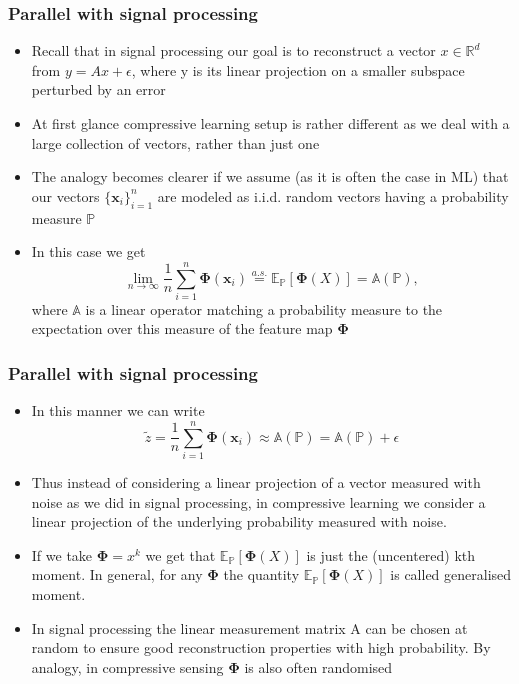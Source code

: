 
\begin{frame}
	\frametitle{Parallel with signal processing}
	
	\begin{itemize}
	 	\item Recall that in signal processing our goal is to reconstruct a vector $x \in \mathbb{R}^{d}$ from $y = Ax + \epsilon$, where y is its linear projection on a smaller subspace perturbed by an error
	 	\item At first glance compressive learning setup is rather different as we deal with a large collection of vectors, rather than just one
	 	\item The analogy becomes clearer if we assume (as it is often the case in ML) that our vectors {$\{\boldsymbol{x}_{i}\}_{i = 1}^{n}$} are modeled as i.i.d. random vectors having a probability measure $\mathbb{P}$
	 	
	 	\item In this case we get
		$$
				\lim _{n \rightarrow \infty} \frac{1}{n} \sum_{i=1}^{n} \boldsymbol{\Phi}\left(\boldsymbol{x}_{i}\right) \stackrel{a.s.}{=} \mathbb{E_{\mathbb{P}}}[\boldsymbol{\Phi}(X)] = \mathbb{A}(\mathbb{P}),
		$$
		where $\mathbb{A}$ is a linear operator matching a probability measure to the expectation over this measure of the feature map $\boldsymbol{\Phi}$
	\end{itemize}
\end{frame}

\begin{frame}
	\frametitle{Parallel with signal processing}
	\begin{itemize}
		\item In this manner we can write
		$$
		\tilde{z} =  \frac{1}{n} \sum_{i=1}^{n} \boldsymbol{\Phi}(\boldsymbol{x}_{i}) \approx \mathbb{A}(\mathbb{P}) = \mathbb{A}(\mathbb{P}) + \epsilon
		$$
		\item Thus instead of considering a linear projection of a vector measured with noise as we did in signal processing, in compressive learning we consider a linear projection of the underlying probability measured with noise.
		
		\item If we take $\boldsymbol{\Phi} = x^{k}$ we get that $\mathbb{E_{\mathbb{P}}}[\boldsymbol{\Phi}(X)]$ is just the (uncentered) kth moment. In general, for any $\boldsymbol{\Phi}$ the quantity $\mathbb{E_{\mathbb{P}}}[\boldsymbol{\Phi}(X)]$ is called generalised moment.
		
		\item In signal processing the linear measurement matrix A can be chosen at random to ensure good reconstruction properties with high probability. By analogy, in compressive sensing $\boldsymbol{\Phi}$ is also often randomised
	\end{itemize}
\end{frame}

